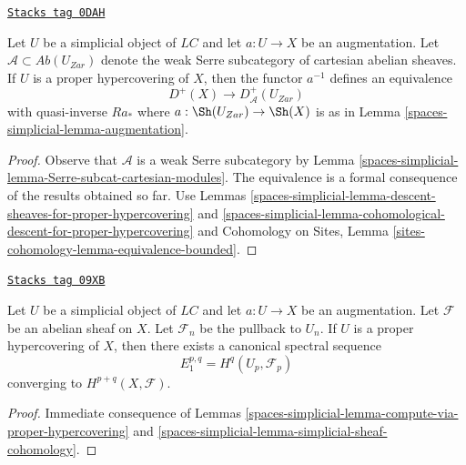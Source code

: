\begin{lemma}
\label{spaces-simplicial-lemma-proper-hypercovering-equivalence-bounded}
\href{https://stacks.math.columbia.edu/tag/0DAH}{\texttt{Stacks tag 0DAH}}

Let $U$ be a simplicial object of $\textit{LC}$ and let $a : U \to X$
be an augmentation.
Let $\mathcal{A} \subset \textit{Ab}(U_{Zar})$
denote the weak Serre subcategory of cartesian abelian sheaves.
If $U$ is a proper hypercovering of $X$, then
the functor $a^{-1}$ defines an equivalence
$$
D^+(X) \longrightarrow D_\mathcal{A}^+(U_{Zar})
$$
with quasi-inverse $Ra_*$ where $a : \Sh(U_{Zar}) \to \Sh(X)$
is as in Lemma \ref{spaces-simplicial-lemma-augmentation}.
\end{lemma}

\begin{proof}
Observe that $\mathcal{A}$ is a weak Serre subcategory by
Lemma \ref{spaces-simplicial-lemma-Serre-subcat-cartesian-modules}.
The equivalence is a
formal consequence of the results obtained so far. Use
Lemmas \ref{spaces-simplicial-lemma-descent-sheaves-for-proper-hypercovering} and
\ref{spaces-simplicial-lemma-cohomological-descent-for-proper-hypercovering} and
Cohomology on Sites, Lemma \ref{sites-cohomology-lemma-equivalence-bounded}.
\end{proof}

\begin{lemma}
\label{spaces-simplicial-lemma-spectral-sequence-proper-hypercovering}
\href{https://stacks.math.columbia.edu/tag/09XB}{\texttt{Stacks tag 09XB}}

Let $U$ be a simplicial object of $\textit{LC}$ and let
$a : U \to X$ be an augmentation. Let $\mathcal{F}$ be an abelian sheaf
on $X$. Let $\mathcal{F}_n$ be the pullback to $U_n$.
If $U$ is a proper hypercovering of $X$, then
there exists a canonical spectral sequence
$$
E_1^{p, q} = H^q(U_p, \mathcal{F}_p)
$$
converging to $H^{p + q}(X, \mathcal{F})$.
\end{lemma}

\begin{proof}
Immediate consequence of Lemmas \ref{spaces-simplicial-lemma-compute-via-proper-hypercovering}
and \ref{spaces-simplicial-lemma-simplicial-sheaf-cohomology}.
\end{proof}

